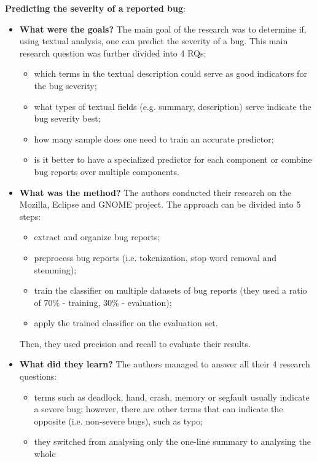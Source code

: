 \documentclass{mprop}
\begin{document}
\textbf{Predicting the severity of a reported bug}\cite{lamkanfi2010predicting}:
\begin{itemize}
  \item \textbf{What were the goals?}
    The main goal of the research was to determine if, using textual analysis, one can
    predict the severity of a bug. This main research question was further divided into
    4 RQs:
      \begin{itemize}
        \item which terms in the textual description could serve as good indicators for
        the bug severity;
        \item what types of textual fields (e.g. summary, description) serve indicate the
        bug severity best;
        \item how many sample does one need to train an accurate predictor;
        \item is it better to have a specialized predictor for each component or combine
        bug reports over multiple components.
      \end{itemize}
  \item \textbf{What was the method?}
    The authors conducted their research on the Mozilla, Eclipse and GNOME project. The 
    approach can be divided into 5 steps:
      \begin{itemize}
        \item extract and organize bug reports;
        \item preprocess bug reports (i.e. tokenization, stop word removal and stemming);
        \item train the classifier on multiple datasets of bug reports (they used a ratio of
        70\% - training, 30\% - evaluation);
        \item apply the trained classifier on the evaluation set.
      \end{itemize}
        Then, they used precision and recall to evaluate their results.
  \item \textbf{What did they learn?}
    The authors managed to answer all their 4 research questions:
      \begin{itemize}
        \item terms such as deadlock, hand, crash, memory or segfault usually indicate a severe bug;
        however, there are other terms that can indicate the opposite (i.e. non-severe bugs),
        such as typo;
        \item they switched from analysing only the one-line summary to analysing the whole

\end{itemize}
\end{itemize}
\end{document}
